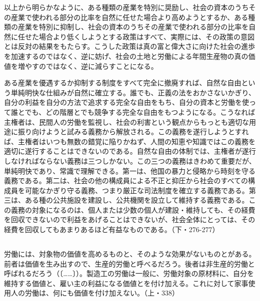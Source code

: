 以上から明らかなように、ある種類の産業を特別に奨励し、社会の資本のうちその産業で使われる部分の比率を自然に任せた場合より高めようとするか、ある種類の産業を特別に抑制し、社会の資本のうちその産業で使われる部分の比率を自然に任せた場合より低くしようとする政策はすべて、実際には、その政策の意図とは反対の結果をもたらす。こうした政策は真の富と偉大さに向けた社会の進歩を加速するのではなく、逆に妨げ、社会の土地と労働による年間生産物の真の価値を増やすのではなく、逆に減らすことになる。

ある産業を優遇するか抑制する制度をすべて完全に撤廃すれば、自然な自由という単純明快な仕組みが自然に確立する。誰でも、正義の法をおかさないかぎり、自分の利益を自分の方法で追求する完全な自由をもち、自分の資本と労働を使って誰とでも、どの階層とでも競争する完全な自由をもつようになる。こうなれば主権者は、民間人の労働を監視し、社会の利害という観点からもっとも適切な用途に振り向けようと試みる義務から解放される。この義務を遂行しようとすれば、主権者はいつも無数の錯覚に陥りかねず、人間の知恵や知識ではこの義務を適切に遂行することはできないのである。自然な自由の体制では、主権者が遂行しなければならない義務は三つしかない。この三つの義務はきわめて重要だが、単純明快であり、常識で理解できる。第一は、他国の暴力と侵略から時刻を守る義務である。第二は、社会の他の構成員による不正と抑圧から社会のすべての構成員を可能なかぎり守る義務、つまり厳正な司法制度を確立する義務である。第三は、ある種の公共施設を建設し、公共機関を設立して維持する義務である。この義務の対象になるのは、個人または少数の個人が建設・維持しても、その経費を回収できないので利益をあげることはできないが、社会全体にとっては、その経費を回収してもあまりあるほど有益なものである。（下・276-277）












\subsection{}


労働には、対象物の価値を高めるものと、そのような効果がないものとがある。前者は価値を生み出すので、生産的労働と呼べるだろう。後者は非生産的労働と呼ばれるだろう（〔……〕）。製造工の労働は一般に、労働対象の原材料に、自分を維持する価値と、雇い主の利益になる価値とを付け加える。これに対して家事使用人の労働は、何にも価値を付け加えない。（上・338）

